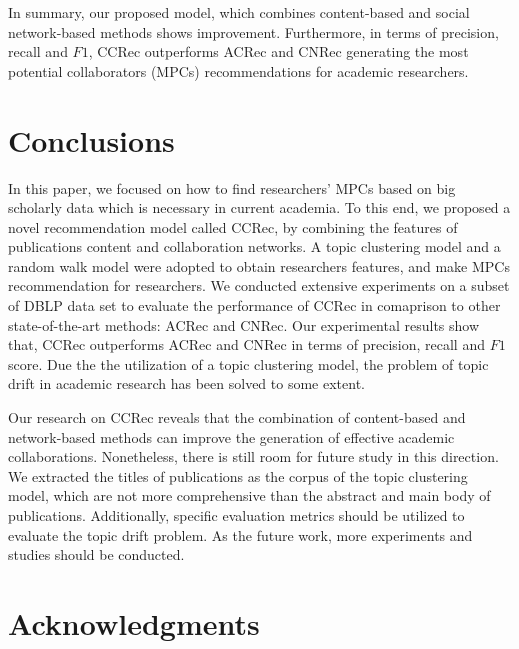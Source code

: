 \documentclass[10pt,letterpaper]{article}
\begin{document}
In summary, our proposed model, which combines content-based and social network-based methods shows improvement. Furthermore, in terms of precision, recall and $F1$, CCRec outperforms ACRec and CNRec generating the most potential collaborators (MPCs) recommendations for academic researchers.

\section*{Conclusions}
In this paper, we focused on how to find researchers' MPCs based on big scholarly data which is necessary in current academia. To this end, we proposed a novel recommendation model called CCRec, by combining the features of publications content and collaboration networks. A topic clustering model and a random walk model were adopted to obtain researchers features, and make MPCs recommendation for researchers. We conducted extensive experiments on a subset of DBLP data set to evaluate the performance of CCRec in comaprison to other state-of-the-art methods: ACRec and CNRec. Our experimental results show that, CCRec outperforms ACRec and CNRec in terms of precision, recall and $F1$ score. Due the the utilization of a topic clustering model, the problem of topic drift in academic research has been solved to some extent.

Our research on CCRec reveals that the combination of content-based and network-based methods can improve the generation of effective academic collaborations. Nonetheless, there is still room for future study in this direction. We extracted the titles of publications as the corpus of the topic clustering model, which are not more comprehensive than the abstract and main body of publications. Additionally, specific evaluation metrics should be utilized to evaluate the topic drift problem. As the future work, more experiments and studies should be conducted.

\section*{Acknowledgments}

\nolinenumbers

%
%
%
\end{document}
